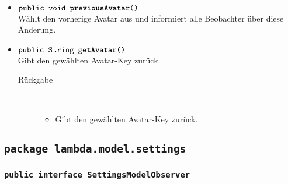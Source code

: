\begin{description}
\begin{itemize}
		\item $\texttt{public void \textbf{previousAvatar}()}$ \\ Wählt den vorherige Avatar aus und informiert alle Beobachter über diese Änderung.
		
		\item $\texttt{public String \textbf{getAvatar}()}$ \\ Gibt den gewählten Avatar-Key zurück.
		\begin{description}
			\item[Rückgabe] \hfill \\
			\vspace{-.8cm}
			\begin{itemize}
				\item Gibt den gewählten Avatar-Key zurück.
			\end{itemize}
		\end{description}
	\end{itemize}
\end{description}

\subsection{\texttt{package lambda.model.settings}}

\subsubsection{\normalfont \texttt{public interface \textbf{SettingsModelObserver}}}

